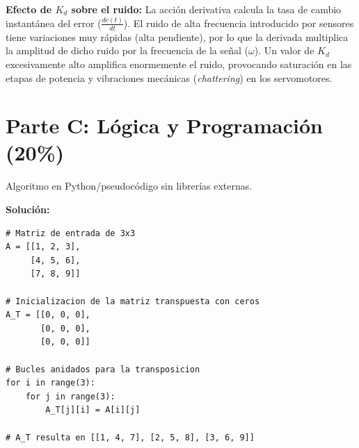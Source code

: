 \documentclass[11pt, a4paper]{article}
\begin{document}
\begin{center}
\end{center}

\textbf{Efecto de $K_d$ sobre el ruido:} 
La acción derivativa calcula la tasa de cambio instantánea del error ($\frac{de(t)}{dt}$). El ruido de alta frecuencia introducido por sensores tiene variaciones muy rápidas (alta pendiente), por lo que la derivada multiplica la amplitud de dicho ruido por la frecuencia de la señal ($\omega$). Un valor de $K_d$ excesivamente alto amplifica enormemente el ruido, provocando saturación en las etapas de potencia y vibraciones mecánicas (\textit{chattering}) en los servomotores.

\vspace{0.5cm}

\section*{Parte C: Lógica y Programación (20\%)}

\begin{enunciado}
Algoritmo en Python/pseudocódigo sin librerías externas.
\end{enunciado}

\textbf{Solución:}
\begin{lstlisting}
# Matriz de entrada de 3x3
A = [[1, 2, 3], 
     [4, 5, 6], 
     [7, 8, 9]]

# Inicializacion de la matriz transpuesta con ceros
A_T = [[0, 0, 0], 
       [0, 0, 0], 
       [0, 0, 0]]

# Bucles anidados para la transposicion
for i in range(3):
    for j in range(3):
        A_T[j][i] = A[i][j]

# A_T resulta en [[1, 4, 7], [2, 5, 8], [3, 6, 9]]
\end{lstlisting}
\end{document}
